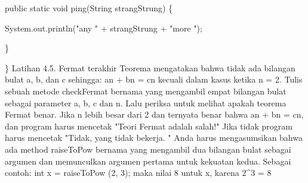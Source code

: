 public static void ping(String strangStrung) \{
	\par
	System.out.println("any " + strangStrung + "more ");
	\par
\}
\par
\}
\newline
\newline
Latihan 4.5. Fermat terakhir Teorema mengatakan bahwa tidak ada bilangan bulat a, b, dan c sehingga:
\newline
an + bn = cn
\newline
\newline
kecuali dalam kasus ketika n = 2.
\newline
\newline
Tulis sebuah metode checkFermat bernama yang mengambil empat bilangan bulat sebagai parameter a, b, c dan n. Lalu periksa untuk melihat apakah teorema Fermat benar. Jika n lebih besar dari 2 dan ternyata benar bahwa an + bn = cn, dan program harus mencetak "Teori Fermat adalah salah!" Jika tidak program harus mencetak "Tidak, yang tidak bekerja. "
\newline
Anda harus mengasumsikan bahwa ada method raiseToPow bernama yang mengambil dua bilangan bulat sebagai argumen dan memunculkan argumen pertama untuk kekuatan kedua. Sebagai contoh:
\newline
\newline
int x = raiseToPow (2, 3);
\newline
\newline
maka nilai 8 untuk x, karena 2^3 = 8
